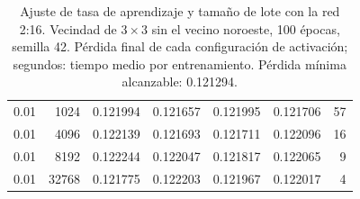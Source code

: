 \begin{table}[H]
\begin{tabular}{rrrrrrr}
		\midrule
		0.01 & 1024 & 0.121994 & 0.121657 & 0.121995 & 0.121706 & 57 \\
		0.01 & 4096 & 0.122139 & 0.121693 & 0.121711 & 0.122096 & 16 \\
		0.01 & 8192 & 0.122244 & 0.122047 & 0.121817 & 0.122065 & 9 \\
		0.01 & 32768 & 0.121775 & 0.122203 & 0.121967 & 0.122017 & 4 \\
		\bottomrule
	\end{tabular}
	\caption{Ajuste de tasa de aprendizaje y tamaño de lote con la red 2:16. Vecindad de $3\times3$ sin el vecino noroeste, 100 épocas, semilla 42. Pérdida final de cada configuración de activación; segundos: tiempo medio por entrenamiento. Pérdida mínima alcanzable: 0.121294.}
	\label{tab:vecindad_ajuste_2x16}
\end{table}

